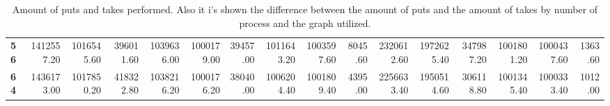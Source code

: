 \begin{table}[!ht]
{\begin{tabular}{lrrrrrrrrrrrrrrr}
\textbf{56} & 1412557.20 & 1016545.60 &  396011.60 & 1039636.00 & 1000179.00 &   39457.00 &      1011643.20 & 1003597.60 &    8045.60 &       2320612.60 & 1972625.40 &  347987.20 &      1001801.20 & 1000437.60 &    1363.60 \\
\textbf{64} & 1436173.00 & 1017850.20 &  418322.80 & 1038216.20 & 1000176.20 &   38040.00 &      1006204.40 & 1001809.40 &    4395.00 &       2256633.40 & 1950514.60 &  306118.80 &      1001345.40 & 1000333.40 &    1012.00 \\
\bottomrule
\end{tabular}}
\label{difference}
\caption{Amount of puts and takes performed. Also it i's shown
    the difference between the amount of puts and the amount of takes
    by number of process and the graph utilized.}
\end{table}
